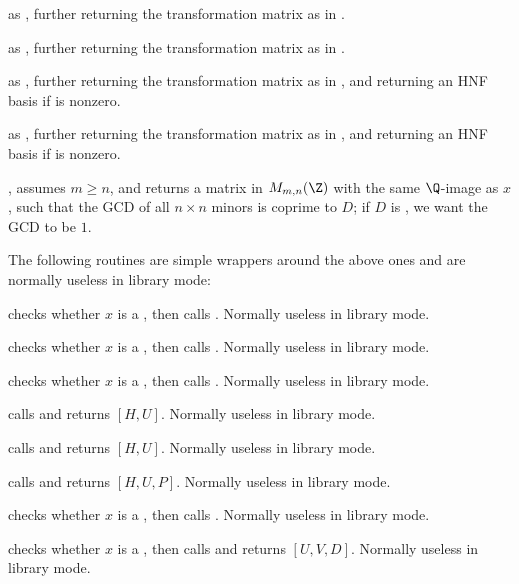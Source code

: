  as ,
further returning the transformation matrix as in .

 as ,
further returning the transformation matrix as in .

 as ,
further returning the transformation matrix as in , and
returning an HNF basis if  is nonzero.

 as ,
further returning the transformation matrix as in , and
returning an HNF basis if  is nonzero.

, assumes $m\geq n$, and returns
a matrix in $M_{m,n}(\Z)$ with the same $\Q$-image as $x$, such that
the GCD of all $n\times n$ minors is coprime to $D$; if $D$ is ,
we want the GCD to be $1$.
\smallskip

The following routines are simple wrappers around the above ones and are
normally useless in library mode:

 checks whether $x$ is a , then calls .
Normally useless in library mode.

 checks whether $x$ is a , then calls
. Normally useless in library mode.

 checks whether $x$ is a , then calls
. Normally useless in library mode.

 calls
 and returns $[H, U]$. Normally useless in library
mode.

 calls  and returns $[H,
U]$. Normally useless in library mode.

 calls  and returns
$[H, U, P]$. Normally useless in library mode.

 checks whether $x$ is a , then calls
. Normally useless in library mode.

 checks whether $x$ is a , then calls
 and returns $[U,V,D]$. Normally useless in
library mode.

